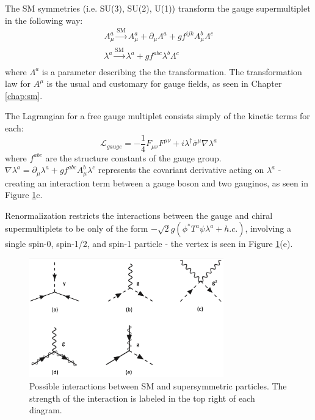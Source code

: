 The SM symmetries (i.e. SU(3), SU(2), U(1)) transform the gauge supermultiplet in the following way:
\begin{equation}
\begin{array}{l}
A_{\mu}^{a} \xrightarrow[]{\text{SM}}  A_{\mu}^{a} + \partial_{\mu}\Lambda^{a} + gf^{ijk}A_{\mu}^{b}\Lambda^{c}\\
\lambda^{a} \xrightarrow[]{\text{SM}}  \lambda^{a} + gf^{abc}\lambda^{b}\Lambda^{c}
\end{array}
\end{equation}
where $\Lambda^{a}$ is a parameter describing the the transformation. The transformation law for $A^{\mu}$ is the usual and customary for gauge fields, as seen in Chapter \ref{chap:sm}.

The Lagrangian for a free gauge multiplet consists simply of the kinetic terms for each:
\begin{equation}
\mathcal{L}_{gauge} = -\frac{1}{4}F_{\mu\nu}F^{\mu\nu} + i \lambda^{\dagger}\bar{\sigma}^{\mu}\nabla\lambda^{a}
\end{equation}
where $f^{abc}$ are the structure constants of the gauge group. $\nabla\lambda^{a} = \partial_{\mu}\lambda^{a}+gf^{abc}A^{b}_{\mu}\lambda^{c}$ represents the covariant derivative acting on $\lambda^{a}$ - creating an interaction term between a gauge boson and two gauginos, as seen in Figure \ref{fig:mssmfeyn}c.

Renormalization restricts the interactions between the gauge and chiral supermultiplets to be only of the form $-\sqrt{2}g(\phi^{*}T^{a}\psi\lambda^{a}+h.c.)$, involving a single spin-0, spin-1/2, and spin-1 particle - the vertex is seen in Figure \ref{fig:mssmfeyn}(e).

\begin{figure}[hb!]
\centering
\includegraphics[width=0.75\textwidth]{figs/mssmfeyn.png}
\caption{Possible interactions between SM and supersymmetric particles. The strength of the interaction is labeled in the top right of each diagram.}
\label{fig:mssmfeyn}
\end{figure}

